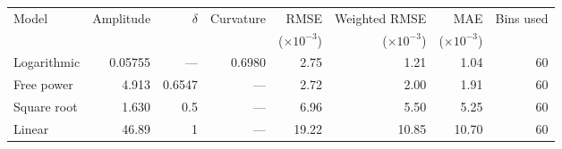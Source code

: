 \begin{tabular}{lrrrrrrr}
\toprule
Model & Amplitude & $\delta$ & Curvature & RMSE & Weighted RMSE & MAE & Bins used \\
 & & & & ($\times 10^{-3}$) & ($\times 10^{-3}$) & ($\times 10^{-3}$) & \\
\midrule
Logarithmic & 0.05755 & --- & 0.6980 & 2.75 & 1.21 & 1.04 & 60 \\
Free power & 4.913 & 0.6547 & --- & 2.72 & 2.00 & 1.91 & 60 \\
Square root & 1.630 & 0.5 & --- & 6.96 & 5.50 & 5.25 & 60 \\
Linear & 46.89 & 1 & --- & 19.22 & 10.85 & 10.70 & 60 \\
\bottomrule
\end{tabular}
